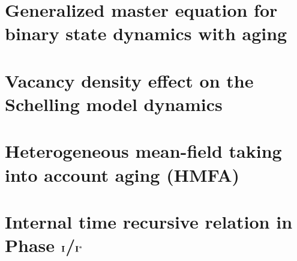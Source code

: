 \documentclass[
	11pt, %
	a4paper,
]{LegrandOrangeBook}
\begin{document}
\begin{appendices}

\renewcommand{\chaptername}{Appendix} %


\chapterspaceabove{6.75cm}
\chapterspacebelow{7.25cm}

\chapter{\label{app:DERIVATION OF MASTER EQUATION WITH AGING} Generalized master equation for binary state dynamics with aging}



\chapterspaceabove{6.75cm}
\chapterspacebelow{7.25cm}

\chapter{Vacancy density effect on the Schelling model dynamics}




\chapterspaceabove{6.75cm}
\chapterspacebelow{7.25cm}

\chapter{\label{appendix_HMFA} Heterogeneous mean-field taking into account aging (HMFA)}




\chapterspaceabove{6.75cm}
\chapterspacebelow{7.25cm}

\chapter{\label{appendix_RR} Internal time recursive relation in Phase ${\rm {\bf I}}$/${\rm {\bf I}}^{*}$}



\end{appendices}

\end{document}
